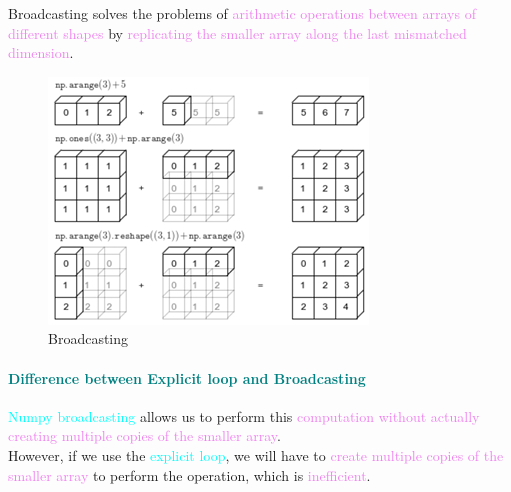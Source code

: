 \documentclass{book}
\begin{document}
Broadcasting solves the problems of \textcolor{violet}{arithmetic operations between arrays of different shapes} by \textcolor{violet}{replicating the smaller array along the last mismatched dimension}.\\

\begin{figure}[h]
    \centering
    \includegraphics[scale=0.36]{chapter 2/ch2_figure6.jpeg}
    \caption{Broadcasting}
\end{figure}
\newpage
\textcolor{teal}{\paragraph{Difference between Explicit loop and Broadcasting}}
\textcolor{cyan}{Numpy broadcasting} allows us to perform this \textcolor{violet}{computation without actually creating multiple copies of the smaller array}.\\
However, if we use the \textcolor{cyan}{explicit loop}, we will have to \textcolor{violet}{create multiple copies of the smaller array} to perform the operation, which is \textcolor{violet}{inefficient}.
\end{document}
